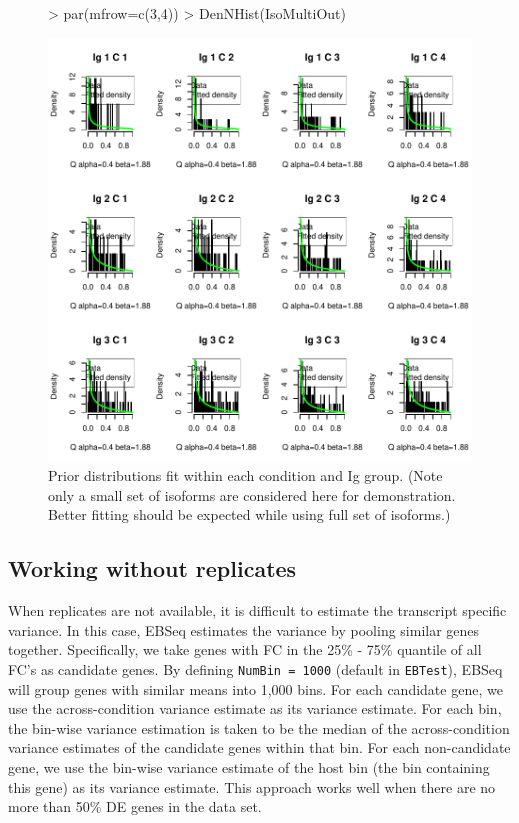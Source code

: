 \documentclass{article}
\begin{document}
\begin{figure}[h]
\centering
\begin{Schunk}
\begin{Sinput}
> par(mfrow=c(3,4))
> DenNHist(IsoMultiOut)
\end{Sinput}
\end{Schunk}
\includegraphics{EBSeq_Vignette-047}
\caption{ Prior distributions fit within each condition and Ig group. 
(Note only a small set of isoforms are considered here for demonstration.
Better fitting should be expected while using full set of isoforms.)}
\label{fig:IsoMultiDenNHist}
\end{figure}
\clearpage
\newpage


\newpage
\subsection{Working without replicates}
When replicates are not available, it is difficult to estimate the transcript specific variance.
In this case, EBSeq estimates the variance by  pooling similar genes together.  
Specifically, we take genes with FC in the 25\% - 75\% quantile of all FC's as 
candidate genes. By defining \verb+NumBin = 1000+ (default in \verb+EBTest+), EBSeq 
will group genes with similar means into 1,000 bins. 
For each candidate gene, we use the across-condition variance estimate as its variance estimate. 
For each bin, the bin-wise variance estimation is taken to be the median of the 
across-condition variance estimates of the candidate genes within that bin. 
For each non-candidate gene, we use the bin-wise variance estimate of the host bin (the bin containing this gene) 
as its variance estimate.
This approach works well when there are no more than 50\% DE genes in the data set. 
\end{document}
